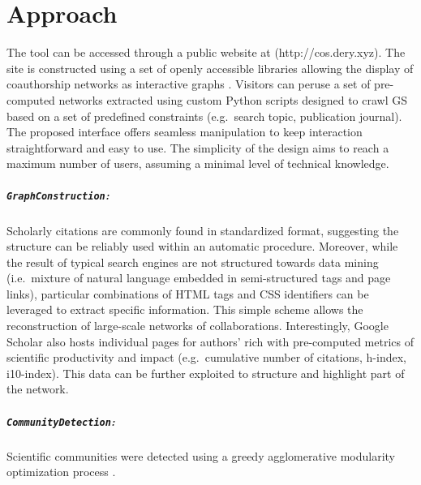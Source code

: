 \documentclass[twocolumn]{bmcart}%
\begin{document}
\section{Approach}\label{approach}

The tool can be accessed through a public website at
(http://cos.dery.xyz). The site is constructed using a set of openly
accessible libraries allowing the display of coauthorship networks as
interactive graphs \cite{Holten2009:ForceDirected}. Visitors can peruse
a set of pre-computed networks extracted using custom Python scripts
designed to crawl GS based on a set of predefined constraints
(e.g.~search topic, publication journal). The proposed interface offers
seamless manipulation to keep interaction straightforward and easy to
use. The simplicity of the design aims to reach a maximum number of
users, assuming a minimal level of technical knowledge.

\subparagraph{\texorpdfstring{\texttt{GraphConstruction}:}{:}}\label{section}

Scholarly citations are commonly found in standardized format,
suggesting the structure can be reliably used within an automatic
procedure. Moreover, while the result of typical search engines are not
structured towards data mining (i.e.~mixture of natural language
embedded in semi-structured tags and page links), particular
combinations of HTML tags and CSS identifiers can be leveraged to
extract specific information. This simple scheme allows the
reconstruction of large-scale networks of collaborations. Interestingly,
Google Scholar also hosts individual pages for authors' rich with
pre-computed metrics of scientific productivity and impact
(e.g.~cumulative number of citations, h-index, i10-index). This data can
be further exploited to structure and highlight part of the network.

\subparagraph{\texorpdfstring{\texttt{CommunityDetection}:}{:}}\label{section-1}

Scientific communities were detected using a greedy agglomerative
modularity optimization process \cite{Blondel08fastunfolding}.
\end{document}
